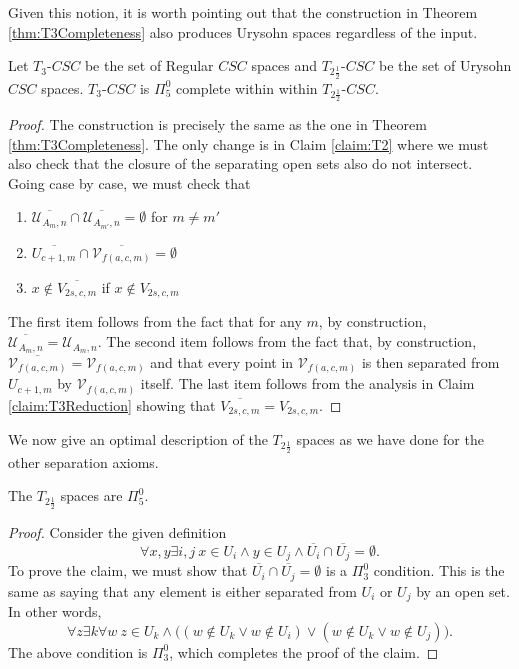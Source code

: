 \documentclass[11pt]{amsart}
\theoremstyle{remark}
\begin{document}
    Given this notion, it is worth pointing out that the construction in Theorem \ref{thm:T3Completeness} also produces Urysohn spaces regardless of the input.

    \begin{corollary}
    Let $T_3$-$CSC$ be the set of Regular $CSC$ spaces and $T_{2\frac12}$-$CSC$ be the set of Urysohn $CSC$ spaces.
    $T_3$-$CSC$ is $\Pi_5^0$ complete within within $T_{2\frac12}$-$CSC$.
    \end{corollary}



    \begin{proof}
        The construction is precisely the same as the one in Theorem \ref{thm:T3Completeness}.
        The only change is in Claim \ref{claim:T2} where we must also check that the closure of the separating open sets also do not intersect.
        Going case by case, we must check that
        \begin{enumerate}
            \item $\overline{\mathcal{U}_{A_m,n}}\cap\overline{\mathcal{U}_{A_{m'},n}}=\emptyset$ for $m\neq m'$
            \item $\overline{U_{c+1,m}}\cap \overline{\mathcal{V}_{f(a,c,m)}}=\emptyset$
            \item $x\not\in \overline{V_{2s,c,m}}$ if $x\not\in V_{2s,c,m}$
        \end{enumerate}

        The first item follows from the fact that for any $m$, by construction, $\overline{\mathcal{U}_{A_m,n}}=\mathcal{U}_{A_m,n}$.
        The second item follows from the fact that, by construction,  $\overline{\mathcal{V}_{f(a,c,m)}}=\mathcal{V}_{f(a,c,m)}$ and that every point in $\mathcal{V}_{f(a,c,m)}$ is then separated from $U_{c+1,m}$ by $\mathcal{V}_{f(a,c,m)}$ itself.
        The last item follows from the analysis in Claim \ref{claim:T3Reduction} showing that $\overline{V_{2s,c,m}}=V_{2s,c,m}$.
    \end{proof}

    We now give an optimal description of the $T_{2\frac12}$ spaces as we have done for the other separation axioms.

    \begin{proposition}
        The $T_{2\frac12}$ spaces are $\Pi_5^0$.
    \end{proposition}

    \begin{proof}
        Consider the given definition
        \[\forall x,y \exists i,j ~ x\in U_i\land y\in U_j \land \overline{U_i}\cap\overline{U_j}=\emptyset.\]
        To prove the claim, we must show that $\overline{U_i}\cap\overline{U_j}=\emptyset$ is a $\Pi_3^0$ condition.
        This is the same as saying that any element is either separated from $U_i$ or $U_j$ by an open set.
        In other words,
        \[\forall z \exists k \forall w~ z\in U_k\land \Big((w\not\in U_k\lor w\not\in U_i) \lor (w\not\in U_k\lor w\not\in U_j)\Big).\]
        The above condition is $\Pi_3^0$, which completes the proof of the claim.
    \end{proof}
\end{document}

